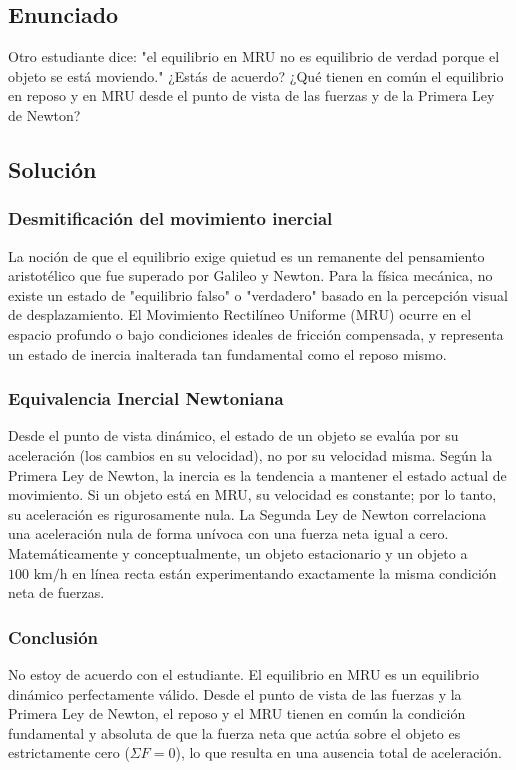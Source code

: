 \documentclass[12pt, a4paper]{article}
\begin{document}
\newpage
\subsection*{Enunciado}
Otro estudiante dice: "el equilibrio en MRU no es equilibrio de verdad porque el objeto se está moviendo." ¿Estás de acuerdo? ¿Qué tienen en común el equilibrio en reposo y en MRU desde el punto de vista de las fuerzas y de la Primera Ley de Newton?

\subsection*{Solución}

\subsubsection*{Desmitificación del movimiento inercial}
La noción de que el equilibrio exige quietud es un remanente del pensamiento aristotélico que fue superado por Galileo y Newton. Para la física mecánica, no existe un estado de "equilibrio falso" o "verdadero" basado en la percepción visual de desplazamiento. El Movimiento Rectilíneo Uniforme (MRU) ocurre en el espacio profundo o bajo condiciones ideales de fricción compensada, y representa un estado de inercia inalterada tan fundamental como el reposo mismo.

\subsubsection*{Equivalencia Inercial Newtoniana}
Desde el punto de vista dinámico, el estado de un objeto se evalúa por su aceleración (los cambios en su velocidad), no por su velocidad misma. Según la Primera Ley de Newton, la inercia es la tendencia a mantener el estado actual de movimiento. Si un objeto está en MRU, su velocidad es constante; por lo tanto, su aceleración es rigurosamente nula. La Segunda Ley de Newton correlaciona una aceleración nula de forma unívoca con una fuerza neta igual a cero. Matemáticamente y conceptualmente, un objeto estacionario y un objeto a $100 \text{ km/h}$ en línea recta están experimentando exactamente la misma condición neta de fuerzas.

\subsubsection*{Conclusión}
No estoy de acuerdo con el estudiante. El equilibrio en MRU es un equilibrio dinámico perfectamente válido. Desde el punto de vista de las fuerzas y la Primera Ley de Newton, el reposo y el MRU tienen en común la condición fundamental y absoluta de que la fuerza neta que actúa sobre el objeto es estrictamente cero ($\Sigma F = 0$), lo que resulta en una ausencia total de aceleración.
\end{document}
